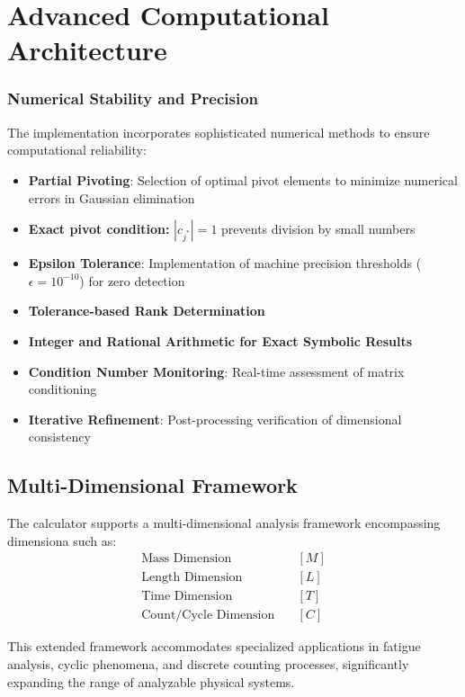 \section{Advanced Computational Architecture}
\subsubsection*{Numerical Stability and Precision}
The implementation incorporates sophisticated numerical methods to ensure computational reliability:
\begin{itemize}
    \item \textbf{Partial Pivoting}: Selection of optimal pivot elements to minimize numerical errors in Gaussian elimination
    \item \textbf{Exact pivot condition:} $|c_{j^*}| = 1$ prevents division by small numbers
    \item \textbf{Epsilon Tolerance}: Implementation of machine precision thresholds ($\epsilon = 10^{-10}$) for zero detection
    \item \textbf{Tolerance-based Rank Determination}
    \item \textbf{Integer and Rational Arithmetic for Exact Symbolic Results}
    \item \textbf{Condition Number Monitoring}: Real-time assessment of matrix conditioning
    \item \textbf{Iterative Refinement}: Post-processing verification of dimensional consistency
\end{itemize}

\subsection{Multi-Dimensional Framework}
The calculator supports a multi-dimensional analysis framework encompassing dimensiona such as:
\begin{align}
\text{Mass Dimension} &\quad [M] \\
\text{Length Dimension} &\quad [L] \\
\text{Time Dimension} &\quad [T] \\
\text{Count/Cycle Dimension} &\quad [C]
\end{align}

This extended framework accommodates specialized applications in fatigue analysis, cyclic phenomena, and discrete counting processes, significantly expanding the range of analyzable physical systems.

